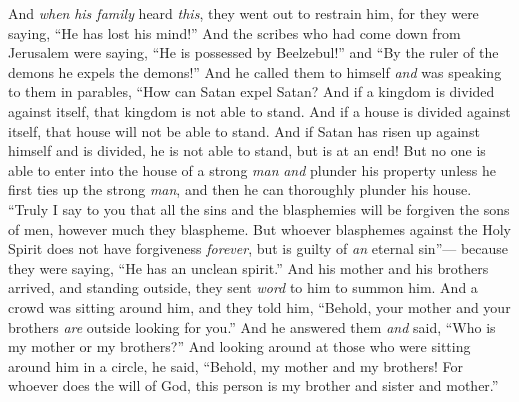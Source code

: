 \begin{biblechapter}
\verse And \textit{when} \textit{his family} heard \textit{this}, they went out to restrain him, for they were saying, “He has lost his mind!”
\verse And the scribes who had come down from Jerusalem were saying, “He is possessed by Beelzebul!” and “By the ruler of the demons he expels the demons!”
\verse And he called them to himself \textit{and} was speaking to them in parables, “How can Satan expel Satan?
\verse And if a kingdom is divided against itself, that kingdom is not able to stand.
\verse And if a house is divided against itself, that house will not be able to stand.
\verse And if Satan has risen up against himself and is divided, he is not able to stand, but is at an end!
\verse But no one is able to enter into the house of a strong \textit{man} \textit{and} plunder his property unless he first ties up the strong \textit{man}, and then he can thoroughly plunder his house.
\verse “Truly I say to you that all the sins and the blasphemies will be forgiven the sons of men, however much they blaspheme.
\verse But whoever blasphemes against the Holy Spirit does not have forgiveness \textit{forever}, but is guilty of \textit{an} eternal sin”—
\verse because they were saying, “He has an unclean spirit.”
 And his mother and his brothers arrived, and standing outside, they sent \textit{word} to him to summon him.
\verse And a crowd was sitting around him, and they told him, “Behold, your mother and your brothers \textit{are} outside looking for you.”
\verse And he answered them \textit{and} said, “Who is my mother or my brothers?”
\verse And looking around at those who were sitting around him in a circle, he said, “Behold, my mother and my brothers!
\verse For whoever does the will of God, this person is my brother and sister and mother.”
\end{biblechapter}

